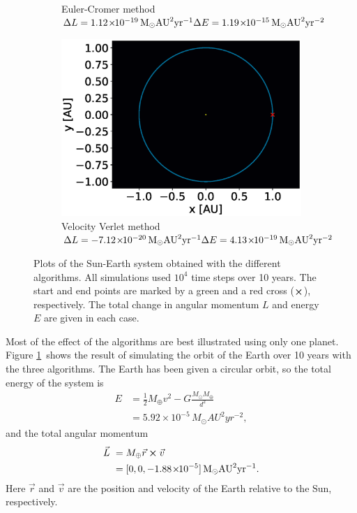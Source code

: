 \documentclass[a4paper,10pt,twocolumn]{article}
\newcommand{\ee}[1]{\!\times\!\!10^{#1}} 	%
\newcommand{\un}[1]{\,\si{#1}}		%
\begin{document}
\begin{figure}[b]
\begin{subfigure}{.33\textwidth}
		\caption{Euler-Cromer method\\
			$
			\Delta L = 1.12\ee{-19} \un{M_\odot AU^2yr^{-1}}
			\\\Delta E = 1.19\ee{-15} \un{M_\odot AU^2 yr^{-2}}
			$}
	\end{subfigure}%
	\begin{subfigure}{.33\textwidth}
		 \centering
		 \includegraphics[width=\linewidth]{se10vv4.eps}
		 \caption{Velocity Verlet method\\
		 $
		 \Delta L = -7.12\ee{-20} \un{M_\odot AU^2yr^{-1}}
		 \\\Delta E = 4.13\ee{-19} \un{M_\odot AU^2 yr^{-2}}
		 $}
	\end{subfigure}
	\caption{Plots of the Sun-Earth system obtained with the different algorithms. All simulations used $10^4$ time steps over 10 years. The start and end points are marked by a green and a red cross ($\cross$), respectively. The total change in angular momentum $L$ and energy $E$ are given in each case.}
	\label{fig:compare}
\end{figure}

Most of the effect of the algorithms are best illustrated using only one planet. 
Figure \ref{fig:compare} shows the result of simulating the orbit of the Earth over 10 years with the three algorithms. The Earth has been given a circular orbit, so the total energy of the system is
\begin{align}
E &= \frac{1}{2}M_\oplus v^2 - G\frac{M_\odot M_\oplus}{d^2}	\nonumber
\\&= 5.92\ee{-5} \un{M_\odot AU^2 yr^{-2}},	\label{eq:E}
\end{align}
and the total angular momentum
\begin{align}
\vec{L} &= M_\oplus\vec{r}\cross\vec{v}	\nonumber
\\&= [0,0,-1.88\ee{-5}] \un{M_\odot AU^2 yr^{-1}}. \label{eq:L}
\end{align}
Here $\vec{r}$ and $\vec{v}$ are the position and velocity of the Earth relative to the Sun, respectively.
\end{document}
